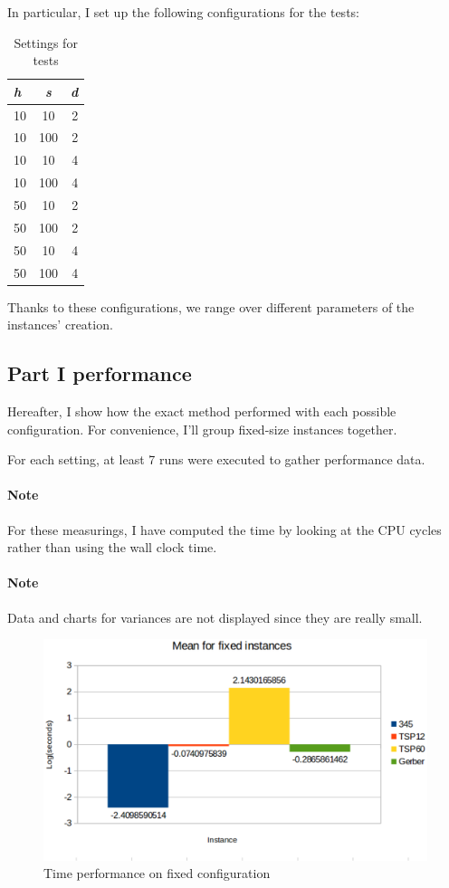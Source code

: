 In particular, I set up the following configurations for the tests:

\begin{table}[H]
  \centering
  \begin{tabular}{|l|c|r|}
    \hline
    \textbf{\textit{h}} & \textbf{\textit{s}} & \textbf{\textit{d}} \\
    \hline
    \hline
    10 & 10  & 2 \\
    \hline
    10 & 100 & 2 \\
    \hline
    10 & 10  & 4 \\
    \hline
    10 & 100 & 4 \\
    \hline
    50 & 10  & 2 \\
    \hline
    50 & 100 & 2 \\
    \hline
    50 & 10  & 4 \\
    \hline
    50 & 100 & 4 \\
    \hline
  \end{tabular}
  \caption{Settings for tests}
  \label{tab:settings}
\end{table}

Thanks to these configurations, we range over different parameters of the
instances' creation.

\subsection{Part I performance}

Hereafter, I show how the exact method performed with each possible
configuration. For convenience, I'll group fixed-size instances together.

For each setting, at least 7 runs were executed to gather performance data.

\paragraph{Note} For these measurings, I have computed the time by looking at
the CPU cycles rather than using the wall clock time.

\paragraph{Note} Data and charts for variances are not displayed since they are
really small.

\begin{figure}[H]
  \centering
  \includegraphics[width=.8\columnwidth]{pics/partI/mean-fixed.eps}
  \caption{Time performance on fixed configuration}
  \label{fig:mean-time-fixed}
\end{figure}

